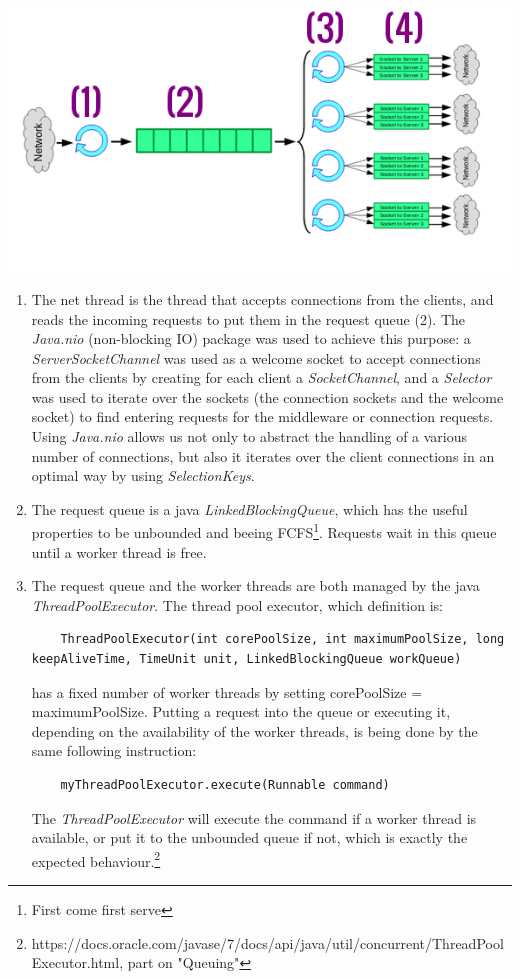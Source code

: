 \documentclass[11pt,a4paper]{article}
\begin{document}
\begin{center}
\includegraphics[scale=0.69]{baseIm.png}
\end{center}
\begin{enumerate}[ {(}1{)} ]
\item The net thread is the thread that accepts connections from the clients, and reads the incoming requests to put them in the request queue (2). The \textit{Java.nio} (non-blocking IO) package was used to achieve this purpose: a \textit{ServerSocketChannel} was used as a welcome socket to accept connections from the clients by creating for each client a \textit{SocketChannel}, and a \textit{Selector} was used to iterate over the sockets (the connection sockets and the welcome socket) to find entering requests for the middleware or connection requests. Using \textit{Java.nio} allows us not only to abstract the handling of a various number of connections, but also it iterates over the client connections in an optimal way by using \textit{SelectionKeys}. 
\item The request queue is a java \textit{LinkedBlockingQueue}, which has the useful properties to be unbounded and beeing FCFS\footnote{First come first serve}. Requests wait in this queue until a worker thread is free.   

\item The request queue and the worker threads are both managed by the java \textit{ThreadPoolExecutor}. The thread pool executor, which definition is: 
\begin{lstlisting}
	ThreadPoolExecutor(int corePoolSize, int maximumPoolSize, long keepAliveTime, TimeUnit unit, LinkedBlockingQueue workQueue)
\end{lstlisting} 
has a fixed number of worker threads by setting corePoolSize = maximumPoolSize. Putting a request into the queue or executing it, depending on the availability of the worker threads, is being done by the same following instruction:
\begin{lstlisting}
	myThreadPoolExecutor.execute(Runnable command)
\end{lstlisting}
The \textit{ThreadPoolExecutor} will execute the command if a worker thread is available, or put it to the unbounded queue if not, which is exactly the expected behaviour.\footnote{https://docs.oracle.com/javase/7/docs/api/java/util/concurrent/ThreadPoolExecutor.html, part on "Queuing"}     
 

\end{enumerate}
\end{document}
